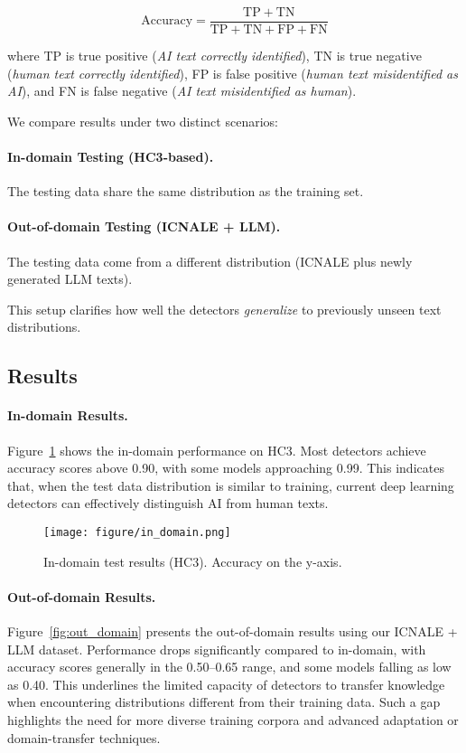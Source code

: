 \begin{equation}
\mathrm{Accuracy}=\frac{\mathrm{TP}+\mathrm{TN}}{\mathrm{TP}+\mathrm{TN}+\mathrm{FP}+\mathrm{FN}}
\end{equation}

\noindent where TP is true positive (\emph{AI text correctly identified}), TN is true negative (\emph{human text correctly identified}), FP is false positive (\emph{human text misidentified as AI}), and FN is false negative (\emph{AI text misidentified as human}).

We compare results under two distinct scenarios:
\paragraph{In-domain Testing (HC3-based).} The testing data share the same distribution as the training set. 
\paragraph{Out-of-domain Testing (ICNALE + LLM).} The testing data come from a different distribution (ICNALE plus newly generated LLM texts).

This setup clarifies how well the detectors \emph{generalize} to previously unseen text distributions.


\subsection{Results}

\paragraph{In-domain Results.} Figure~\ref{fig:in_domain} shows the in-domain performance on HC3. Most detectors achieve accuracy scores above 0.90, with some models approaching 0.99. This indicates that, when the test data distribution is similar to training, current deep learning detectors can effectively distinguish AI from human texts. 

\begin{figure}[!t]
    \centering
    \texttt{[image: figure/in\_domain.png]}
    \caption{In-domain test results (HC3). Accuracy on the y-axis.}
    \label{fig:in_domain}
\end{figure}

\paragraph{Out-of-domain Results.} 
Figure~\ref{fig:out_domain} presents the out-of-domain results using our ICNALE + LLM dataset. Performance drops significantly compared to in-domain, with accuracy scores generally in the 0.50--0.65 range, and some models falling as low as 0.40. This underlines the limited capacity of detectors to transfer knowledge when encountering distributions different from their training data. Such a gap highlights the need for more diverse training corpora and advanced adaptation or domain-transfer techniques.

